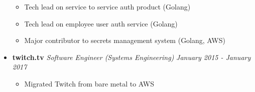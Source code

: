 \documentclass[11pt]{article}
\newcommand{\job}[4]{
  \textbf{#1} \hfill #2 \hfill \textit{#3} \hfill \textit{#4}
}
\begin{document}
\begin{itemize}[leftmargin=*,itemsep=20pt]
\begin{itemize}
	      	\item Tech lead on service to service auth product (Golang)
	      	\item Tech lead on employee user auth service (Golang)
	      	\item Major contributor to secrets management system (Golang, AWS)
	      \end{itemize}
	\item[]
	      \job
	      {twitch.tv}
	      {}
	      {Software Engineer (Systems Engineering)}
	      {January 2015 - January 2017}
	      \begin{itemize}
	      	\item Migrated Twitch from bare metal to AWS
	      \end{itemize}
\end{itemize}




\ 
\end{document}
